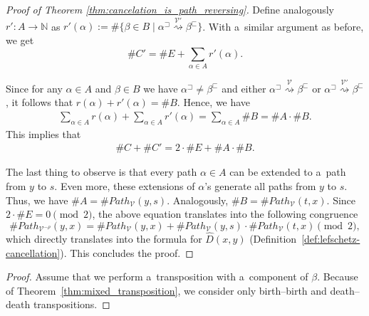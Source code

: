 \documentclass[a4paper,12pt, USenglish,cleveref,autoref,thm-restate]{article}
\newcommand{\mf}{h}
\newcommand{\dmf}{\text{dMf}}
\newcommand{\mB}{D}
\newcommand{\pbeg}[1]{#1^\sqsubset}
\newcommand{\pend}[1]{#1^\sqsupset}
\newcommand{\bdt}{\beta}
\newcommand{\NN}{\mathbb{N}}
\newcommand{\cV}{\mathcal{V}}
\newcommand{\pathhs}{Path}
\def\pathh#1{\overset{#1}{\rightsquigarrow}}
\def\pathh#1{\overset{#1}{\rightsquigarrow}}
\begin{document}
\begin{appendices}
\begin{proof}[Proof of Theorem \ref{thm:cancelation_is_path_reversing}]
    \noindent Define analogously 
    $r'\colon A\rightarrow\NN$ as 
        $r'(\alpha):=\#\{\beta\in B\mid \pend\alpha\pathh{\cV'}\pbeg\beta\}$.
    With a~similar argument as before, we get
    \begin{equation}\label{eq:counting_connecting_revpaths}
        \# C' = \# E + \sum_{\alpha\in A} r'(\alpha).
    \end{equation}
    
    \noindent Since for any $\alpha\in A$ and $\beta\in B$ we have $\pend\alpha \neq \pbeg\beta$ and
        either $\pend\alpha \pathh{\cV} \pbeg\beta$ or $\pend\alpha \pathh{\cV'} \pbeg\beta$, 
        it follows that $r(\alpha) + r'(\alpha) = \# B$.
    Hence, we have
    \begin{align*}
        \sum_{\alpha\in A} r(\alpha) + \sum_{\alpha\in A} r'(\alpha) =
            \sum_{\alpha \in A} \# B = \# A \cdot \# B.
    \end{align*}
    This implies that
    \begin{align*}
        \label{eq:paths_after_inv}
        \# C + \# C' = 2 \cdot \#E + \#A \cdot \# B.
    \end{align*}
    
    \noindent The last thing to observe is that every path $\alpha\in A$ can be extended to a~path from $y$ to $s$.
    Even more, these extensions of $\alpha$'s generate all paths from $y$ to $s$.
    Thus, we have $\# A=\#\pathhs_\cV(y,s)$. Analogously, $\# B =\#\pathhs_\cV(t,x)$.
    Since $2 \cdot \# E = 0 \pmod 2$, the above equation translates into the following congruence
    \begin{equation*}
        \# \pathhs_{\cV^{-\rho}}(y,x)=
            \# \pathhs_{\cV}(y,x) + \# \pathhs_{\cV}(y,s) \cdot \# \pathhs_{\cV}(t,x) \pmod 2, 
    \end{equation*}
    which directly translates into the formula for $\hat{\mB}(x,y)$ (Definition~\ref{def:lefschetz-cancellation}).
    This concludes the proof.
\end{proof}


\WeCanOnlyLose*

\begin{proof}

      Assume that we perform a~transposition with a~component of $\bdt$. Because of Theorem~\ref{thm:mixed_transposition}, we consider only birth--birth and death--death transpositions.


\end{proof}
\end{appendices}
\end{document}
